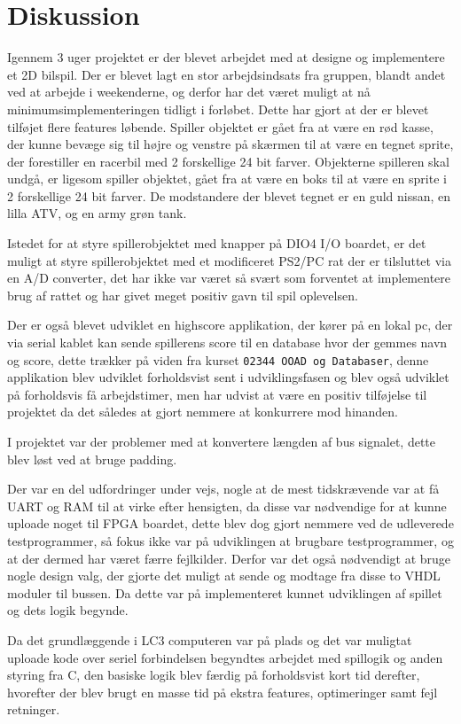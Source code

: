 \chapter{Diskussion}\label{cha:diskussion}
Igennem 3 uger projektet er der blevet arbejdet med at designe og implementere et 2D bilspil. Der er blevet lagt en stor arbejdsindsats fra gruppen, blandt andet ved at arbejde i weekenderne, og derfor har det været muligt at nå minimumsimplementeringen tidligt i forløbet. Dette har gjort at der er blevet tilføjet flere features løbende. Spiller objektet er gået fra at være en rød kasse, der kunne bevæge sig til højre og venstre på skærmen til at være en tegnet sprite, der forestiller en racerbil med 2 forskellige 24 bit farver. Objekterne spilleren skal undgå, er ligesom spiller objektet, gået fra at være en boks til at være en sprite i 2 forskellige 24 bit farver. De modstandere der blevet tegnet er en guld nissan, en lilla ATV, og en army grøn tank.

Istedet for at styre spillerobjektet med knapper på DIO4 I/O boardet, er det muligt at styre spillerobjektet med et modificeret PS2/PC rat der er tilsluttet via en A/D converter, det har ikke var været så svært som forventet at implementere brug af rattet og har givet meget positiv gavn til spil oplevelsen.
 
Der er også blevet udviklet en highscore applikation, der kører på en lokal pc, der via serial kablet kan sende spillerens score til en database hvor der gemmes navn og score, dette trækker på viden fra kurset \texttt{02344 OOAD og Databaser}, denne applikation blev udviklet forholdsvist sent i udviklingsfasen og blev også udviklet på forholdsvis få arbejdstimer, men har udvist at være en positiv tilføjelse til projektet da det således at gjort nemmere at konkurrere mod hinanden.
 
I projektet var der problemer med at konvertere længden af bus signalet, dette blev løst ved at bruge padding.
 
Der var en del udfordringer under vejs, nogle at de mest tidskrævende var at få UART og RAM til at virke efter hensigten, da disse var nødvendige for at kunne uploade noget til FPGA boardet, dette blev dog gjort nemmere ved de udleverede testprogrammer, så fokus ikke var på udviklingen at brugbare testprogrammer, og at der dermed har været færre fejlkilder. Derfor var det også nødvendigt at bruge nogle design valg, der gjorte det muligt at sende og modtage fra disse to VHDL moduler til bussen. Da dette var på implementeret kunnet udviklingen af spillet og dets logik begynde. 

Da det grundlæggende i LC3 computeren var på plads og det var muligtat uploade kode over seriel forbindelsen begyndtes arbejdet med spillogik og anden styring fra C, den basiske logik blev færdig på forholdsvist kort tid derefter, hvorefter der blev brugt en masse tid på ekstra features, optimeringer samt fejl retninger.

 


